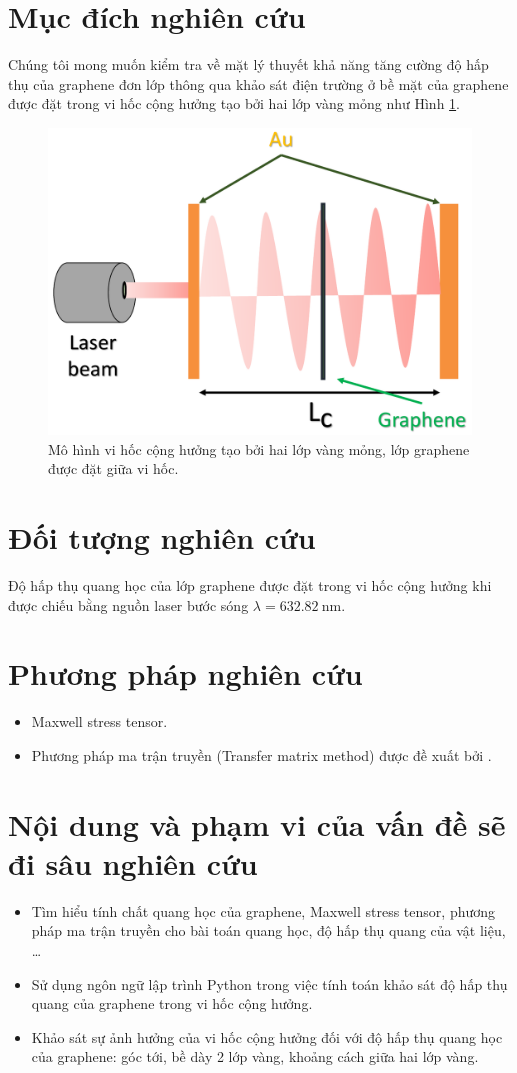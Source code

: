 \documentclass[a4paper]{elsarticle}
\begin{document}
\section{Mục đích nghiên cứu}
Chúng tôi mong muốn kiểm tra về mặt lý thuyết khả năng tăng cường độ hấp thụ của graphene đơn lớp thông qua khảo sát điện trường ở bề mặt của graphene được đặt trong vi hốc cộng hưởng tạo bởi hai lớp vàng mỏng như Hình \ref{fig:1}. 
\begin{figure}[h]
	\centering
	\includegraphics[width=0.6\linewidth]{figs/fig1model.pdf}
	\caption{Mô hình vi hốc cộng hưởng tạo bởi hai lớp vàng mỏng, lớp graphene được đặt giữa vi hốc.}
	\label{fig:1}
\end{figure}
\section{Đối tượng nghiên cứu}
Độ hấp thụ quang học của lớp graphene được đặt trong vi hốc cộng hưởng khi được chiếu bằng nguồn laser bước sóng $\lambda=\SI{632.82}{\nano\meter}$.
\section{Phương pháp nghiên cứu}
\begin{itemize}
	\item Maxwell stress tensor.
	\item Phương pháp ma trận truyền (Transfer matrix method) được đề xuất bởi \cite{ZhanTMM}.
\end{itemize}
\section{Nội dung và phạm vi của vấn đề sẽ đi sâu nghiên cứu}
\begin{itemize}
	\item Tìm hiểu tính chất quang học của graphene, Maxwell stress tensor, phương pháp ma trận truyền cho bài toán quang học, độ hấp thụ quang của vật liệu, \dots
	\item Sử dụng ngôn ngữ lập trình Python trong việc tính toán khảo sát độ hấp thụ quang của graphene trong vi hốc cộng hưởng.
	\item Khảo sát sự ảnh hưởng của vi hốc cộng hưởng đối với độ hấp thụ quang học của graphene: góc tới, bề dày 2 lớp vàng, khoảng cách giữa hai lớp vàng.
\end{itemize}
\end{document}
